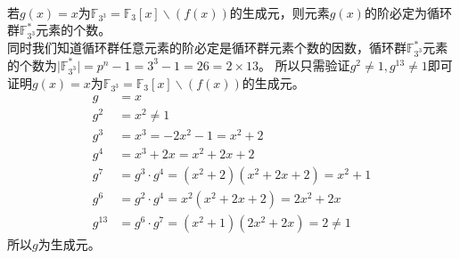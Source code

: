 \begin{solution}\ \\
    若$g(x)=x$为$\mathbb{F}_{3^3}=\mathbb{F}_3[x]\backslash(f(x))$的生成元，则元素$g(x)$的阶必定为循环群$\mathbb{F}_{3^3}^*$元素的个数。\\
    同时我们知道循环群任意元素的阶必定是循环群元素个数的因数，循环群$\mathbb{F}_{3^3}^*$元素的个数为$\mid\mathbb{F}_{3^3}^*\mid=p^n-1=3^3-1=26=2\times 13$。
    所以只需验证$g^2\neq 1,g^{13}\neq 1$即可证明$g(x)=x$为$\mathbb{F}_{3^3}=\mathbb{F}_3[x]\backslash(f(x))$的生成元。
    \begin{equation*}
        \begin{aligned}
            g&=x\\
            g^2&=x^2\neq 1\\
            g^3&=x^3=-2x^2-1=x^2+2\\
            g^4&=x^3+2x=x^2+2x+2\\
            g^7&=g^3\cdot g^4=(x^2+2)(x^2+2x+2)=x^2+1\\
            g^6&=g^2\cdot g^4=x^2(x^2+2x+2)=2x^2+2x\\
            g^{13}&=g^6\cdot g^7=(x^2+1)(2x^2+2x)=2\neq 1
        \end{aligned}
    \end{equation*}
    所以$g$为生成元。
\end{solution}